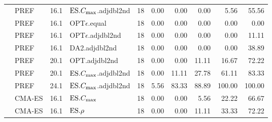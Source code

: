 \begin{table}[p]
{\begin{tabular}{llllrrrrrr}
& PREF & 16.1 & $\text{ES}.{C_{\max}}$.adjdbl2nd & 18 & 0.00 & 0.00 & 0.00 & 5.56 & 55.56 
\\ 
& PREF & 16.1 & OPT$\epsilon$.equal & 18 & 0.00 & 0.00 & 0.00 & 0.00 & 0.00 \\ 
& PREF & 16.1 & OPT$\epsilon$.adjdbl2nd & 18 & 0.00 & 0.00 & 0.00 & 0.00 & 
11.11 \\ 
& PREF & 16.1 & DA2.adjdbl2nd & 18 & 0.00 & 0.00 & 0.00 & 0.00 & 38.89 \\ 
& PREF & 20.1 & OPT.adjdbl2nd & 18 & 0.00 & 0.00 & 11.11 & 16.67 & 72.22 \\ 
& PREF & 20.1 & $\text{ES}.{C_{\max}}$.adjdbl2nd & 18 & 0.00 & 11.11 & 27.78 & 61.11 & 
83.33 \\ 
& PREF & 24.1 & $\text{ES}.{C_{\max}}$.adjdbl2nd & 18 & 5.56 & 83.33 & 88.89 & 100.00 &  
100.00 \\ \cmidrule(r){2-10}
& CMA-ES & 16.1 & $\text{ES}.{C_{\max}}$ & 18 & 0.00 & 0.00 & 5.56 & 22.22 & 66.67 \\ 
& CMA-ES & 16.1 & $\text{ES}.{\rho}$ & 18 & 0.00 & 0.00 & 11.11 & 33.33 & 72.22 \\ 
\bottomrule
\end{tabular}}
\end{table}